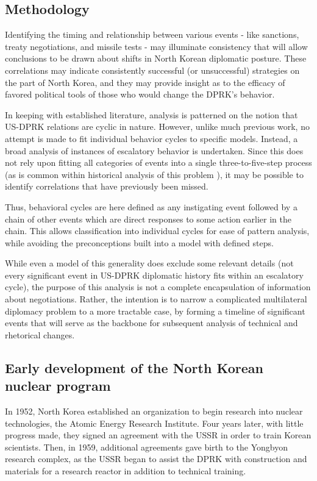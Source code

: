\documentclass{article}
\begin{document}
\subsection{Methodology}

Identifying the timing and relationship between various events - like sanctions, treaty negotiations, and missile tests - may illuminate consistency that will allow conclusions to be drawn about shifts in North Korean diplomatic posture. These correlations may indicate consistently successful (or unsuccessful) strategies on the part of North Korea, and they may provide insight as to the efficacy of favored political tools of those who would change the DPRK's behavior.

In keeping with established literature, analysis is patterned on the notion that US-DPRK relations are cyclic in nature. However, unlike much previous work, no attempt is made to fit individual behavior cycles to specific models. Instead, a broad analysis of instances of escalatory behavior is undertaken. Since this does not rely upon fitting all categories of events into a single three-to-five-step process (as is common within historical analysis of this problem \cite{fisher, jun}), it may be possible to identify correlations that have previously been missed.

Thus, behavioral cycles are here defined as any instigating event followed by a chain of other events which are direct responses to some action earlier in the chain. This allows classification into individual cycles for ease of pattern analysis, while avoiding the preconceptions built into a model with defined steps.

While even a model of this generality does exclude some relevant details (not every significant event in US-DPRK diplomatic history fits within an escalatory cycle), the purpose of this analysis is not a complete encapsulation of information about negotiations. Rather, the intention is to narrow a complicated multilateral diplomacy problem to a more tractable case, by forming a timeline of significant events that will serve as the backbone for subsequent analysis of technical and rhetorical changes.

\subsection{Early development of the North Korean nuclear program}
In 1952, North Korea established an organization to begin research into nuclear technologies, the Atomic Energy Research Institute\cite{ntiAERI}. Four years later, with little progress made, they signed an agreement with the USSR in order to train Korean scientists\cite{nti15}. Then, in 1959, additional agreements gave birth to the Yongbyon research complex, as the USSR began to assist the DPRK with construction and materials for a research reactor in addition to technical training\cite{nti15}.
\end{document}
